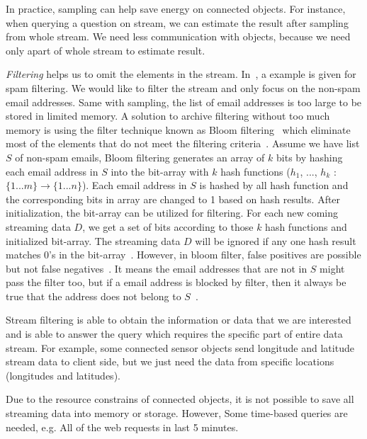 In practice, sampling can help save energy on connected objects. For instance,
when querying a question on stream, we can estimate the result after sampling
from whole stream. We need less communication with objects, because we need only
apart of whole stream to estimate result.

\emph{Filtering} helps us to omit the elements in the stream.
In~\cite{leskovec2014mining}, a example is given for spam filtering. We would
like to filter the stream and only focus on the non-spam email addresses. Same
with sampling, the list of email addresses is too large to be stored in limited
memory. A solution to archive filtering without too much memory is using the
filter technique known as Bloom filtering~\cite{bloom1970space} which eliminate
most of the elements that do not meet the filtering
criteria~\cite{leskovec2014mining}. Assume we have list $S$ of non-spam emails,
Bloom filtering generates an array of $k$ bits by hashing each email address in
$S$ into the bit-array with $k$ hash functions ($h_1$, ..., $h_k$ : $\{1...m\}
\rightarrow \{1...n\}$). Each email address in $S$ is hashed by all hash
function and the corresponding bits in array are changed to 1 based on hash
results. After initialization, the bit-array can be utilized for filtering. For
each new coming streaming data $D$, we get a set of bits according to those $k$
hash functions and initialized bit-array. The streaming data $D$ will be ignored
if any one hash result matches 0's in the bit-array~\cite{leskovec2014mining}.
However, in bloom filter, false positives are possible but not false
negatives~\cite{ahmed2019data}. It means the email addresses that are not in $S$
might pass the filter too, but if a email address is blocked by filter, then it
always be true that the address does not belong to $S$~\cite{ahmed2019data}.

Stream filtering is able to obtain the information or data that we are
interested and is able to answer the query which requires the specific part of
entire data stream. For example, some connected sensor objects send longitude
and latitude stream data to client side, but we just need the data from specific
locations (longitudes and latitudes).


Due to the resource constrains of connected objects, it is not possible to save
all streaming data into memory or storage. However, Some time-based queries are
needed, e.g. All of the web requests in last 5 minutes.

